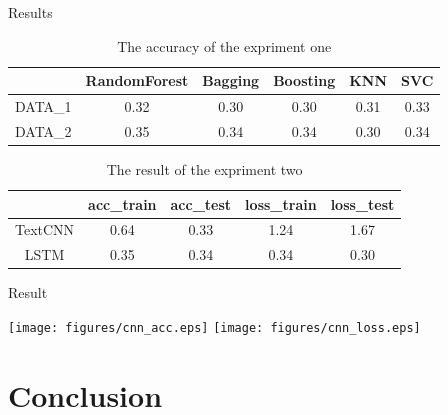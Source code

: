 \documentclass[
 size=14pt,
 paper=smartboard,  %
 mode=present, 		%
 display=slides, 	%
 style=tuliplab,  	%
 pauseslide,
 fleqn,leqno]{powerdot}
\begin{document}
\begin{slide}{Results}
	
	\begin{table}[tb]
		\setlength{\abovecaptionskip}{0pt}
		\setlength{\belowcaptionskip}{10pt}
		\centering
		\caption{The accuracy of the expriment one}
		
		\begin{tabular}{cccccc}
			\toprule
			& RandomForest  & Bagging & Boosting & KNN & SVC\\
			\midrule
			DATA\_1&  0.32 &  0.30 &  0.30 & 0.31 & 0.33\\
			DATA\_2 &  0.35 &  0.34 &  0.34 & 0.30 & 0.34\\
			\bottomrule
		\end{tabular}
	\end{table}
	
	\begin{table}[tb]
		\setlength{\abovecaptionskip}{0pt}
		\setlength{\belowcaptionskip}{10pt}
		\centering
		\caption{The result of the expriment two}
		
		\begin{tabular}{ccccc}
			\toprule
			& acc_train  & acc_test & loss_train & loss_test \\
			\midrule
			TextCNN&  0.64 &  0.33 &  1.24 & 1.67 \\
			LSTM &  0.35 &  0.34 &  0.34 & 0.30 \\
			\bottomrule
		\end{tabular}
	\end{table}
	
\end{slide}


\begin{slide}{Result}
	\begin{center}
		\texttt{[image: figures/cnn\_acc.eps]}
		\quad\texttt{[image: figures/cnn\_loss.eps]}
	\end{center}
	
	
\end{slide}


\section{Conclusion}
\end{document}
